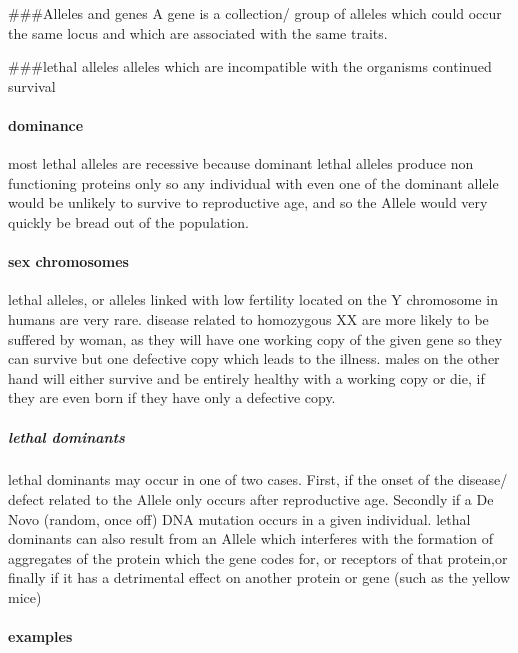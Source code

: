 \documentclass[]{article}
\let\oldparagraph\paragraph
\renewcommand{\paragraph}[1]{\oldparagraph{#1}\mbox{}}
\let\oldsubparagraph\subparagraph
\renewcommand{\subparagraph}[1]{\oldsubparagraph{#1}\mbox{}}
\begin{document}
\#\#\#Alleles and genes A gene is a collection/ group of alleles which
could occur the same locus and which are associated with the same
traits.

\#\#\#lethal alleles alleles which are incompatible with the organisms
continued survival

\hypertarget{dominance-1}{%
\paragraph{dominance}\label{dominance-1}}

most lethal alleles are recessive because dominant lethal alleles
produce non functioning proteins only so any individual with even one of
the dominant allele would be unlikely to survive to reproductive age,
and so the Allele would very quickly be bread out of the population.

\hypertarget{sex-chromosomes}{%
\paragraph{sex chromosomes}\label{sex-chromosomes}}

lethal alleles, or alleles linked with low fertility located on the Y
chromosome in humans are very rare. disease related to homozygous XX are
more likely to be suffered by woman, as they will have one working copy
of the given gene so they can survive but one defective copy which leads
to the illness. males on the other hand will either survive and be
entirely healthy with a working copy or die, if they are even born if
they have only a defective copy.

\hypertarget{lethal-dominants}{%
\subparagraph{lethal dominants}\label{lethal-dominants}}

lethal dominants may occur in one of two cases. First, if the onset of
the disease/ defect related to the Allele only occurs after reproductive
age. Secondly if a De Novo (random, once off) DNA mutation occurs in a
given individual. lethal dominants can also result from an Allele which
interferes with the formation of aggregates of the protein which the
gene codes for, or receptors of that protein,or finally if it has a
detrimental effect on another protein or gene (such as the yellow mice)

\hypertarget{examples-3}{%
\paragraph{examples}\label{examples-3}}
\end{document}
